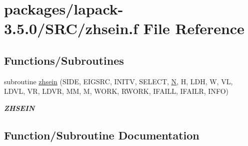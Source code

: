 \hypertarget{zhsein_8f}{}\section{packages/lapack-\/3.5.0/\+S\+R\+C/zhsein.f File Reference}
\label{zhsein_8f}
\subsection*{Functions/\+Subroutines}
\begin{DoxyCompactItemize}
\item 
subroutine \hyperlink{zhsein_8f_ae3613cc30520d60d705dcc04ad31a321}{zhsein} (S\+I\+D\+E, E\+I\+G\+S\+R\+C, I\+N\+I\+T\+V, S\+E\+L\+E\+C\+T, \hyperlink{polmisc_8c_a0240ac851181b84ac374872dc5434ee4}{N}, H, L\+D\+H, W, V\+L, L\+D\+V\+L, V\+R, L\+D\+V\+R, M\+M, M, W\+O\+R\+K, R\+W\+O\+R\+K, I\+F\+A\+I\+L\+L, I\+F\+A\+I\+L\+R, I\+N\+F\+O)
\begin{DoxyCompactList}\small\item\em {\bfseries Z\+H\+S\+E\+I\+N} \end{DoxyCompactList}\end{DoxyCompactItemize}


\subsection{Function/\+Subroutine Documentation}
\hypertarget{zhsein_8f_ae3613cc30520d60d705dcc04ad31a321}{}
